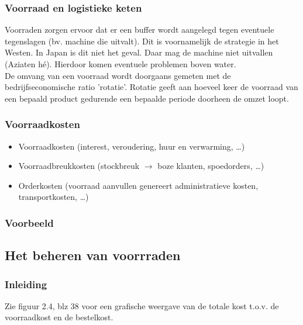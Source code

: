 \documentclass[12pt]{article}
\begin{document}
\subsubsection{Voorraad en logistieke keten}
Voorraden zorgen ervoor dat er een buffer wordt aangelegd tegen eventuele tegenslagen (bv. machine die uitvalt). Dit is voornamelijk de strategie in het Westen. In Japan is dit niet het geval. Daar mag de machine niet uitvallen (Aziaten h\'e). Hierdoor komen eventuele problemen boven water.\\
De omvang van een voorraad wordt doorgaans gemeten met de bedrijfseconomische ratio 'rotatie'. Rotatie geeft aan hoeveel keer de voorraad van een bepaald product gedurende een bepaalde periode doorheen de omzet loopt.
\subsubsection{Voorraadkosten}
\begin{itemize}
\item Voorraadkosten (interest, veroudering, huur en verwarming, \dots)
\item Voorraadbreukkosten (stockbreuk $\rightarrow$ boze klanten, spoedorders, \dots)
\item Orderkosten (voorraad aanvullen genereert administratieve kosten, transportkosten, \dots)
\end{itemize}
\subsubsection{Voorbeeld}
\subsection{Het beheren van voorrraden}
\subsubsection{Inleiding}
Zie figuur 2.4, blz 38 voor een grafische weergave van de totale kost t.o.v. de voorraadkost en de bestelkost.
\end{document}
